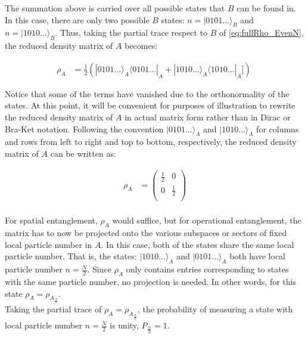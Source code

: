 \begin{samepage}
The summation above is carried over all possible states that $B$ can be found in. In this case, there are only two possible $B$ states: $n = |0101...\rangle_{B}$ and $n = |1010...\rangle_{B} $. Thus, taking the partial trace respect to $B$ of \ref{eq:fullRho_EvenN}, the reduced density matrix of $A$ becomes:

\begin{equation}
\begin{aligned}
\rho_{A} &= \frac{1}{2} ( | 0101... \rangle_{A} \langle 0101... |_{A} +  | 1010... \rangle_{A} \langle 1010... |_{A} ])\
\end{aligned}
\end{equation}

Notice that some of the terms have vanished due to the orthonormality of the states. At this point, it will be convenient for purposes of illustration to rewrite the reduced density matrix of $A$ in actual matrix form rather than in Dirac or Bra-Ket notation. Following the convention $|0101\dots\rangle_{A}$ and $|1010\dots\rangle_{A}$ for columns and rows from left to right and top to bottom, respectively, the reduced density matrix of $A$ can be written as:

\begin{equation}
\begin{aligned}
\rho_{A} &= \begin{pmatrix}
\frac{1}{2} & 0 \\
0 & \frac{1}{2} \\
\end{pmatrix} \\
\end{aligned}
\end{equation}

For spatial entanglement, $\rho_{A}$ would suffice, but for operational entanglement, the matrix has to now be projected onto the various subspaces or sectors of fixed local particle number in $A$. In this case, both of the states share the same local particle number. That is, the states: $|1010...\rangle_{A}$ and $|0101...\rangle_{A}$ both have local particle number $n = \frac{N}{2}$. Since $\rho_{A}$ only contains entries corresponding to states with the same particle number, no projection is needed. In other words, for this state $\rho_{A} = \rho_{A_{\frac{N}{2}}}$. \\

Taking the partial trace of $\rho_{A} = \rho_{A_{\frac{N}{2}}}$, the probability of measuring a state with local particle number $n = \frac{N}{2} $ is unity, $P_{\frac{N}{2}}=1$.


\end{samepage}
